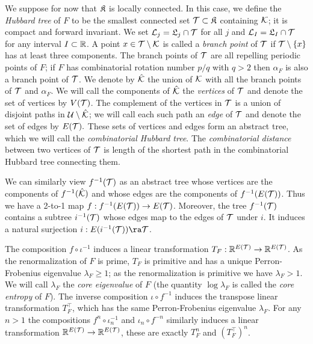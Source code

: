 \documentclass[12pt]{amsart}
\begin{document}
We suppose for now that $\mathfrak{K}$ is locally connected. 
In this case, we define the \textit{Hubbard tree}  of $F$ to be the smallest connected set $\mathcal T\subset \mathfrak{K}$ containing $\mathcal K$; it is  compact and forward invariant. 
We set $\mathcal L_j = \mathfrak{L}_j\cap \mathcal T$ for all $j$ and $\mathcal L_I = \mathfrak{L}_I\cap \mathcal T$ for any interval $I\subset \mathbb R$. 
A point $x\in \mathcal T\setminus \mathcal K$ is called a \textit{branch point} of $\mathcal T$ if $\mathcal T\setminus \{x\}$ has at least three components. The branch points of $\mathcal T$ are all repelling periodic points of $F$; if $F$ has combinatorial rotation number $p/q$ with $q>2$ then $\alpha_F$ is also a branch point of $\mathcal T$.
We denote by $\hat{\mathcal K}$ the union of $\mathcal K$ with all the branch points of $\mathcal T$ and $\alpha_F$. We will call the  components of $\hat{\mathcal K}$ the \textit{vertices} of $\mathcal T$ and denote the set of vertices by $V(\mathcal T)$. The complement of the vertices in $\mathcal T$ is a union of disjoint paths in $\mathcal U\setminus \hat{\mathcal K}$; we will call each such path an \textit{edge} of $\mathcal T$ and denote the set of edges by $E(\mathcal T).$  These sets of vertices and edges form an abstract tree, which we will call the \textit{combinatorial Hubbard tree}.
The \textit{combinatorial distance} between two vertices of $\mathcal T$ is length of the shortest path in the combinatorial Hubbard tree connecting them.


We can similarly view $f^{-1}(\mathcal T)$ as an abstract tree whose vertices are the components of $f^{-1}(\hat{\mathcal K})$ and whose edges are the components of $f^{-1}(E(\mathcal T))$.
Thus we have a 2-to-1 map $f:f^{-1}(E(\mathcal T))\to E(\mathcal T)$.
 {Moreover, the tree $f^{-1} (\mathcal T)$ contains a subtree $i^{-1} (\mathcal T) $
whose edges map to the edges of $\mathcal T$ under $i$.   
It induces a natural surjection $i:  E(i^{-1} (\TT)) \ra \TT$}.  



The composition $f\circ \iota^{-1}$ induces a linear transformation $T_F: \mathbb R^{E(\mathcal T)}\to \mathbb R^{E(\mathcal T)}$. As the renormalization of $F$ is prime,  $T_F$ is primitive and has a unique Perron-Frobenius eigenvalue $\lambda_F\geq 1$; as the renormalization is primitive we have $\lambda_F>1$. We will call $\lambda_F$ the \emph{core eigenvalue} of $F$ (the quantity $\log \lambda_F$ is called the \emph{core entropy} of $F$). 
The inverse composition $\iota\circ f^{-1}$ induces the transpose linear transformation $T_F^\top$, which has the same Perron-Frobenius eigenvalue $\lambda_F$.
For any $n> 1$ the compositions $f^n\circ \iota_n^{-1}$ and $\iota_n\circ f^{-n}$ similarly induces a linear transformation $\mathbb R^{E(\mathcal T)}\to \mathbb R^{E(\mathcal T)}$, these are exactly $T_F^n$ and $(T_F^\top)^n$.
\end{document}
